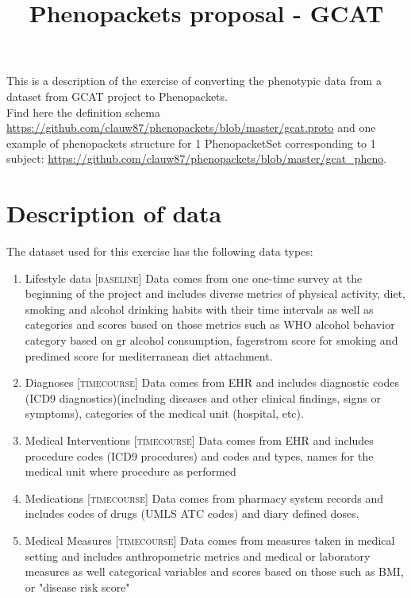 \documentclass[a4paper, 10pt]{article}
\title{Phenopackets proposal - GCAT}
\begin{document}
\date{}
\maketitle




This is a description of the exercise of converting the phenotypic data from a dataset from GCAT project to Phenopackets. \\

Find here the definition schema \url{https://github.com/clauw87/phenopackets/blob/master/gcat.proto} and one example of phenopackets structure for 1 PhenopacketSet corresponding to 1 subject: \url{https://github.com/clauw87/phenopackets/blob/master/gcat\_pheno}.


\section{Description of data}


The dataset used for this exercise has the following data types:
\begin{enumerate}
\item{Lifestyle data} \textsc{[baseline]} Data comes from one one-time survey at the beginning of the project and includes diverse metrics of physical activity, diet, smoking and alcohol drinking habits with their time intervals as well as categories and scores based on those metrics such as WHO alcohol behavior category based on gr alcohol consumption, fagerstrom score for smoking and predimed score for mediterranean diet attachment.

\item{Diagnoses} \textsc{[timecourse]} Data comes from EHR and includes diagnostic codes (ICD9 diagnostics)(including diseases and other clinical findings, signs or symptoms), categories of the medical unit (hospital, etc).

\item{Medical Interventions} \textsc{[timecourse]} Data comes from EHR and includes procedure codes (ICD9 procedures) and codes and types, names for the medical unit where procedure as performed

 \item{Medications} \textsc{[timecourse]} Data comes from pharmacy system records and includes codes of drugs (UMLS ATC codes) and diary defined doses.
 
 \item{Medical Measures} \textsc{[timecourse]} Data comes from measures taken in medical setting and includes anthropometric metrics and medical or laboratory measures as well categorical variables and scores based on those such as BMI, or "disease risk score"
\end{enumerate}
\end{document}
